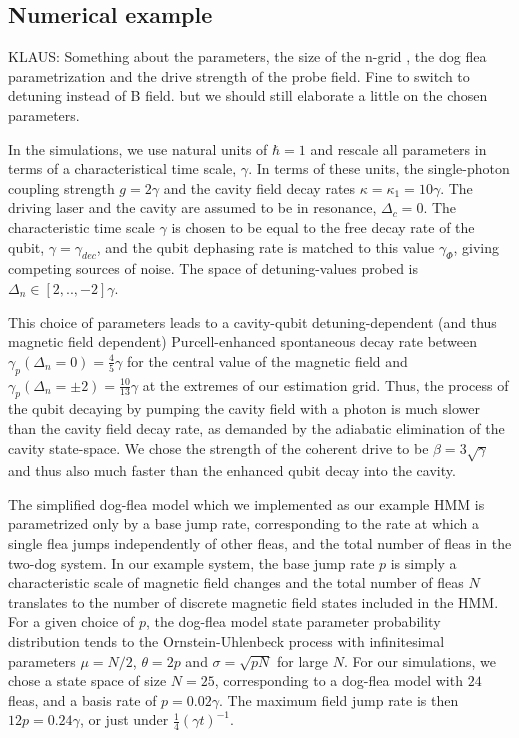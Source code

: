 \documentclass[aps,pra,twocolumn,groupedaddress,showpacs]{revtex4}
\begin{document}
\subsection{Numerical example}

KLAUS: Something about the parameters, the size of the n-grid , the dog flea parametrization and the drive strength of the probe field. Fine to switch to detuning instead of B field. but we should still elaborate a little on the chosen parameters.

In the simulations, we use natural units of $\hbar = 1$ and rescale all parameters in terms of a characteristical time scale, $\gamma$. In terms of these units, the single-photon coupling strength $g = 2 \gamma$ and the cavity field decay rates $\kappa = \kappa_1 = 10 \gamma$. The driving laser and the cavity are assumed to be in resonance, $\Delta_c = 0$. The characteristic time scale $\gamma$ is chosen to be equal to the free decay rate of the qubit, $\gamma = \gamma_{dec}$, and the qubit dephasing rate is matched to this value $\gamma_\Phi$, giving competing sources of noise. The space of detuning-values probed is $\Delta_n \in [2,..,-2] \gamma$.


This choice of parameters leads to a cavity-qubit detuning-dependent (and thus magnetic field dependent) Purcell-enhanced spontaneous decay rate between $\gamma_p(\Delta_n = 0) = \frac{4}{5} \gamma$ for the central value of the magnetic field and $\gamma_p(\Delta_n = \pm 2) = \frac{10}{13} \gamma$ at the extremes of our estimation grid. Thus, the process of the qubit decaying by pumping the cavity field with a photon is much slower than the cavity field decay rate, as demanded by the adiabatic elimination of the cavity state-space. We chose the strength of the coherent drive to be $\beta = 3\sqrt{\gamma}$ and thus also much faster than the enhanced qubit decay into the cavity.


The simplified dog-flea model which we implemented as our example HMM is parametrized only by a base jump rate, corresponding to the rate at which a single flea jumps independently of other fleas, and the total number of fleas in the two-dog system. In our example system, the base jump rate $p$ is simply a characteristic scale of magnetic field changes and the total number of fleas $N$ translates to the number of discrete magnetic field states included in the HMM. For a given choice of $p$, the dog-flea model state parameter probability distribution tends to the Ornstein-Uhlenbeck process with infinitesimal parameters $\mu = N/2$, $\theta = 2 p$ and $\sigma = \sqrt{pN}$ for large $N$. For our simulations, we chose a state space of size $N=25$, corresponding to a dog-flea model with $24$ fleas, and a basis rate of $p = 0.02\gamma$. The maximum field jump rate is then $12 p = 0.24\gamma$, or just under $\frac{1}{4} (\gamma t)^{-1}$.
\end{document}
